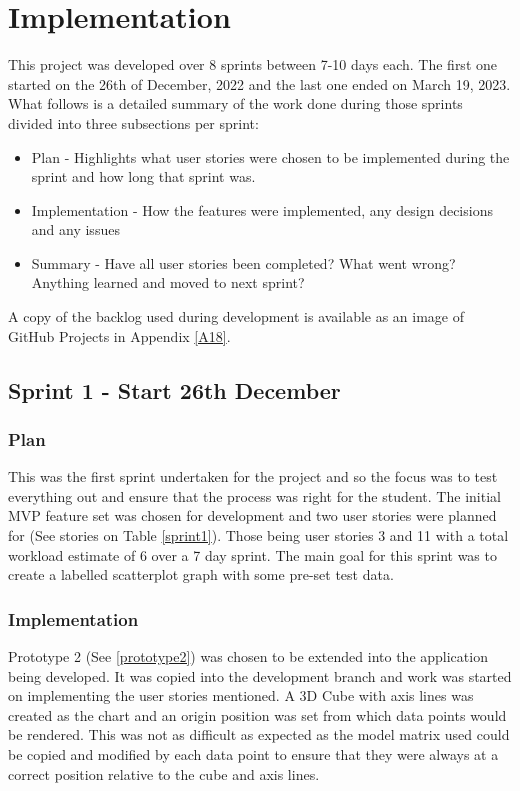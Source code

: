 
\section{Implementation} \label{implementation}
This project was developed over 8 sprints between 7-10 days each. The first one started on the 26th of December, 2022 and the last one ended on March 19, 2023. What follows is a detailed summary of the work done during those sprints divided into three subsections per sprint:
\begin{itemize}
    \item Plan - Highlights what user stories were chosen to be implemented during the sprint and how long that sprint was.
    \item Implementation - How the features were implemented, any design decisions and any issues
    \item Summary - Have all user stories been completed? What went wrong? Anything learned and moved to next sprint?
\end{itemize}

A copy of the backlog used during development is available as an image of GitHub Projects in Appendix \ref{A18}.

\subsection{Sprint 1 - Start 26th December} \label{sprint1-all}
\subsubsection{Plan}
This was the first sprint undertaken for the project and so the focus was to test everything out and ensure that the process was right for the student. The initial MVP feature set was chosen for development and two user stories were planned for (See stories on Table \ref{sprint1}). Those being user stories 3 and 11 with a total workload estimate of 6 over a 7 day sprint. The main goal for this sprint was to create a labelled scatterplot graph with some pre-set test data.

\subsubsection{Implementation} \label{sprint1-imp}
Prototype 2 (See \ref{prototype2}) was chosen to be extended into the application being developed. It was copied into the development branch and work was started on implementing the user stories mentioned. A 3D Cube with axis lines was created as the chart and an origin position was set from which data points would be rendered. This was not as difficult as expected as the model matrix used could be copied and modified by each data point to ensure that they were always at a correct position relative to the cube and axis lines.


